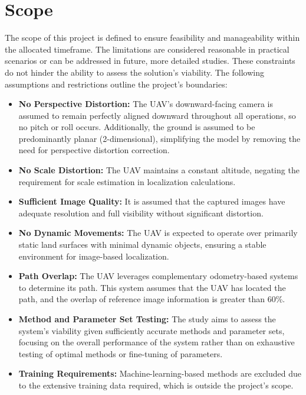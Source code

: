 \section{Scope}
\label{sec:scope}
The scope of this project is defined to ensure feasibility and manageability within the allocated timeframe. The limitations are considered reasonable in practical scenarios or can be addressed in future, more detailed studies. These constraints do not hinder the ability to assess the solution's viability. The following assumptions and restrictions outline the project's boundaries:

\begin{itemize}
    \item \textbf{No Perspective Distortion:} The UAV's downward-facing camera is assumed to remain perfectly aligned downward throughout all operations, so no pitch or roll occurs. Additionally, the ground is assumed to be predominantly planar (2-dimensional), simplifying the model by removing the need for perspective distortion correction.
    
    \item \textbf{No Scale Distortion:} The UAV maintains a constant altitude, negating the requirement for scale estimation in localization calculations.
    
    \item \textbf{Sufficient Image Quality:} It is assumed that the captured images have adequate resolution and full visibility without significant distortion.
    
    \item \textbf{No Dynamic Movements:} The UAV is expected to operate over primarily static land surfaces with minimal dynamic objects, ensuring a stable environment for image-based localization.
    
    \item \textbf{Path Overlap:} The UAV leverages complementary odometry-based systems to determine its path. This system assumes that the UAV has located the path, and the overlap of reference image information is greater than 60\%.
    
    \item \textbf{Method and Parameter Set Testing:} The study aims to assess the system's viability given sufficiently accurate methods and parameter sets, focusing on the overall performance of the system rather than on exhaustive testing of optimal methods or fine-tuning of parameters.
    
    \item \textbf{Training Requirements:} Machine-learning-based methods are excluded due to the extensive training data required, which is outside the project's scope.
    

\end{itemize}
